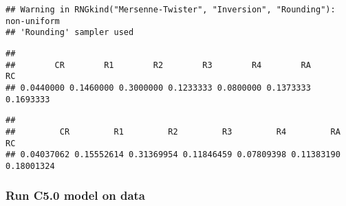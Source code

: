 \documentclass[
]{article}
\newenvironment{Shaded}{\begin{snugshade}}{\end{snugshade}}
\newcommand{\AttributeTok}[1]{\textcolor[rgb]{0.77,0.63,0.00}{#1}}
\newcommand{\CommentTok}[1]{\textcolor[rgb]{0.56,0.35,0.01}{\textit{#1}}}
\newcommand{\DecValTok}[1]{\textcolor[rgb]{0.00,0.00,0.81}{#1}}
\newcommand{\FunctionTok}[1]{\textcolor[rgb]{0.00,0.00,0.00}{#1}}
\newcommand{\NormalTok}[1]{#1}
\newcommand{\OtherTok}[1]{\textcolor[rgb]{0.56,0.35,0.01}{#1}}
\newcommand{\SpecialCharTok}[1]{\textcolor[rgb]{0.00,0.00,0.00}{#1}}
\begin{document}
\begin{verbatim}
## Warning in RNGkind("Mersenne-Twister", "Inversion", "Rounding"): non-uniform
## 'Rounding' sampler used
\end{verbatim}

\begin{Shaded}
\end{Shaded}

\begin{verbatim}
## 
##        CR        R1        R2        R3        R4        RA        RC 
## 0.0440000 0.1460000 0.3000000 0.1233333 0.0800000 0.1373333 0.1693333
\end{verbatim}

\begin{Shaded}
\end{Shaded}

\begin{verbatim}
## 
##         CR         R1         R2         R3         R4         RA         RC 
## 0.04037062 0.15552614 0.31369954 0.11846459 0.07809398 0.11383190 0.18001324
\end{verbatim}

\hypertarget{run-c5.0-model-on-data}{%
\subsubsection{Run C5.0 model on data}\label{run-c5.0-model-on-data}}

\begin{Shaded}
\end{Shaded}
\end{document}
